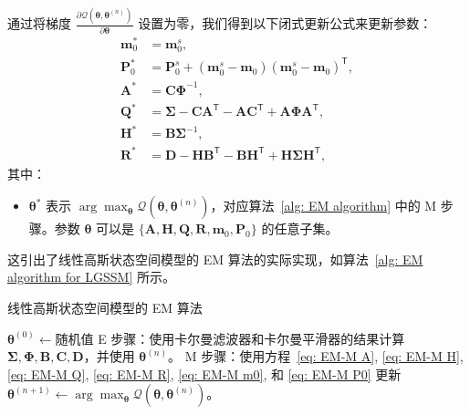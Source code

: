 通过将梯度 \(\frac{\partial \mathcal{Q} (\boldsymbol{\theta}, \boldsymbol{\theta}^{(n)})}{\partial \boldsymbol{\theta}}\) 设置为零，我们得到以下闭式更新公式来更新参数：
\begin{align}
    \mathbf{m}_0^* &= \mathbf{m}_0^s, \label{eq: EM-M m0} \\
    \mathbf{P}_0^* &= \mathbf{P}_0^s + (\mathbf{m}_0^s - \mathbf{m}_0)(\mathbf{m}_0^s - \mathbf{m}_0)^{\mathsf{T}}, \label{eq: EM-M P0} \\
    \mathbf{A}^* &= \mathbf{C} \boldsymbol{\Phi}^{-1}, \label{eq: EM-M A} \\
    \mathbf{Q}^* &= \boldsymbol{\Sigma} - \mathbf{C} \mathbf{A}^{\mathsf{T}} - \mathbf{A} \mathbf{C}^{\mathsf{T}} + \mathbf{A} \boldsymbol{\Phi} \mathbf{A}^{\mathsf{T}}, \label{eq: EM-M Q} \\
    \mathbf{H}^* &= \mathbf{B} \boldsymbol{\Sigma}^{-1}, \label{eq: EM-M H} \\
    \mathbf{R}^* &= \mathbf{D} - \mathbf{H} \mathbf{B}^{\mathsf{T}} - \mathbf{B} \mathbf{H}^{\mathsf{T}} + \mathbf{H} \boldsymbol{\Sigma} \mathbf{H}^{\mathsf{T}}, \label{eq: EM-M R}
\end{align}
其中：
\begin{itemize}
    \item \(\boldsymbol{\theta}^*\) 表示 \(\arg \max_{\boldsymbol{\theta}} \mathcal{Q}(\boldsymbol{\theta}, \boldsymbol{\theta}^{(n)})\)，对应算法~\ref{alg: EM algorithm} 中的 M 步骤。参数 \(\boldsymbol{\theta}\) 可以是 \(\{ \mathbf{A}, \mathbf{H}, \mathbf{Q}, \mathbf{R}, \mathbf{m}_0, \mathbf{P}_0 \}\) 的任意子集。
\end{itemize}

这引出了线性高斯状态空间模型的 EM 算法的实际实现，如算法~\ref{alg: EM algorithm for LGSSM} 所示。

\begin{algorithm}[tb]
    \caption{线性高斯状态空间模型的 EM 算法}
    \label{alg: EM algorithm for LGSSM}
    \begin{algorithmic}[1]
        \STATE \(\boldsymbol{\theta}^{(0)} \gets \text{随机值}\)
            \STATE E 步骤：使用卡尔曼滤波器和卡尔曼平滑器的结果计算 \(\boldsymbol{\Sigma}, \boldsymbol{\Phi}, \mathbf{B}, \mathbf{C}, \mathbf{D}\)，并使用 \(\boldsymbol{\theta}^{(n)}\)。
            \STATE M 步骤：使用方程~\eqref{eq: EM-M A}, \eqref{eq: EM-M H}, \eqref{eq: EM-M Q}, \eqref{eq: EM-M R}, \eqref{eq: EM-M m0}, 和 \eqref{eq: EM-M P0} 更新 \(\boldsymbol{\theta}^{(n+1)} \gets \arg \max_{\boldsymbol{\theta}} \mathcal{Q}(\boldsymbol{\theta}, \boldsymbol{\theta}^{(n)})\)。
        \ENDFOR
    \end{algorithmic}
\end{algorithm}
